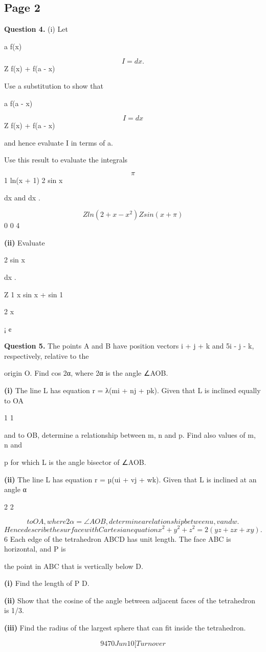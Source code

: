 \documentclass[12pt]{article}
\begin{document}
\subsection*{Page 2}
\begin{flushleft}
\bigskip\textbf{Question 4.} (i) Let\par
a f(x)\par
\[I = dx .\]
Z f(x) + f(a - x)\par
Use a substitution to show that\par
a f(a - x)\par
\[I = dx\]
Z f(x) + f(a - x)\par
and hence evaluate I in terms of a.\par
Use this result to evaluate the integrals\par
\[\pi\]
1 ln(x + 1) 2 sin x\par
dx and dx .\par
\[Z ln(2 + x - x^2) Z sin(x + \pi )\]
0 0 4\par
\textbf{(ii)} Evaluate\par
2 sin x\par
dx .\par
Z 1 x sin x + sin 1\par
2 x\par
¡ ¢\par
\bigskip\textbf{Question 5.} The points A and B have position vectors i + j + k and 5i - j - k, respectively, relative to the\par
origin O. Find cos 2α, where 2α is the angle ∠AOB.\par
\textbf{(i)} The line L has equation r = λ(mi + nj + pk). Given that L is inclined equally to OA\par
1 1\par
and to OB, determine a relationship between m, n and p. Find also values of m, n and\par
p for which L is the angle bisector of ∠AOB.\par
\textbf{(ii)} The line L has equation r = µ(ui + vj + wk). Given that L is inclined at an angle α\par
2 2\par
\[to OA, where 2α = ∠AOB, determine a relationship between u, v and w.\]
\[Hence describe the surface with Cartesian equation x^2 + y^2 + z^2 = 2(yz + zx + xy).\]
6 Each edge of the tetrahedron ABCD has unit length. The face ABC is horizontal, and P is\par
the point in ABC that is vertically below D.\par
\textbf{(i)} Find the length of P D.\par
\textbf{(ii)} Show that the cosine of the angle between adjacent faces of the tetrahedron is 1/3.\par
\textbf{(iii)} Find the radius of the largest sphere that can fit inside the tetrahedron.\par
\[9470 Jun10 [Turn over\]
\end{flushleft}
\end{document}
